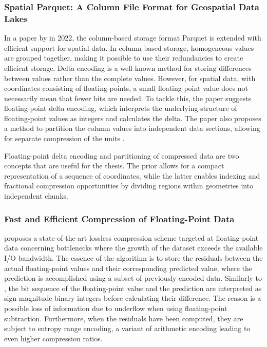 \subsubsection{Spatial Parquet: A Column File Format for Geospatial Data Lakes}
In a paper by \citet{spatialparquet} in 2022, the column-based storage format Parquet is extended with efficient support for spatial data. In column-based storage, homogeneous values are grouped together, making it possible to use their redundancies to create efficient storage. Delta encoding is a well-known method for storing differences between values rather than the complete values. However, for spatial data, with coordinates consisting of floating-points, a small floating-point value does not necessarily mean that fewer bits are needed. To tackle this, the paper suggests floating-point delta encoding, which interprets the underlying structure of floating-point values as integers and calculates the delta. The paper also proposes a method to partition the column values into independent data sections, allowing for separate compression of the units \cite{spatialparquet}. 

Floating-point delta encoding and partitioning of compressed data are two concepts that are useful for the thesis. The prior allows for a compact representation of a sequence of coordinates, while the latter enables indexing and fractional compression opportunities by dividing regions within geometries into independent chunks.

\subsubsection{Fast and Efficient Compression of Floating-Point Data}

\citet{fpzip} proposes a state-of-the-art lossless compression scheme targeted at floating-point data concerning bottlenecks where the growth of the dataset exceeds the available I/O bandwidth. The essence of the algorithm is to store the residuals between the actual floating-point values and their corresponding predicted value, where the prediction is accomplished using a subset of previously encoded data. Similarly to \citet{spatialparquet}, the bit sequence of the floating-point value and the prediction are interpreted as sign-magnitude binary integers before calculating their difference. The reason is a possible loss of information due to underflow when using floating-point subtraction. Furthermore, when the residuals have been computed, they are subject to entropy range encoding, a variant of arithmetic encoding leading to even higher compression ratios.

